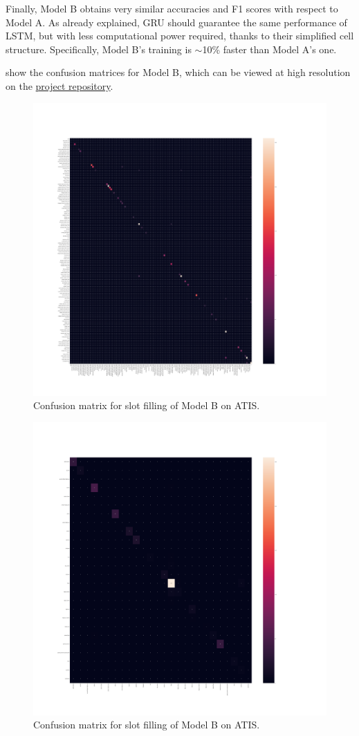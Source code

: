 \documentclass[a4paper]{article}
\begin{document}
Finally, Model B obtains very similar accuracies and F1 scores with respect to Model A. As already explained, GRU should guarantee the same performance of LSTM, but with less computational power required, thanks to their simplified cell structure. Specifically, Model B's training is $\sim$10\% faster than Model A's one.

 show the confusion matrices for Model B, which can be viewed at high resolution on the \href{https://github.com/francescobozzo/NLU/tree/main/cm}{project repository}.

\begin{figure}[!h]
    \centering
    \includegraphics[width=0.8\linewidth]{../cm/cm-model-b-atis-slot.png}
    \caption{Confusion matrix for slot filling of Model B on ATIS.}
    \label{fig:cm-baseline-atis-slot}
\end{figure}

\begin{figure}[!h]
    \centering
    \includegraphics[width=0.8\linewidth]{../cm/cm-model-b-atis-intent.png}
    \caption{Confusion matrix for slot filling of Model B on ATIS.}
    \label{fig:cm-baseline-atis-intent}
\end{figure}
\end{document}
